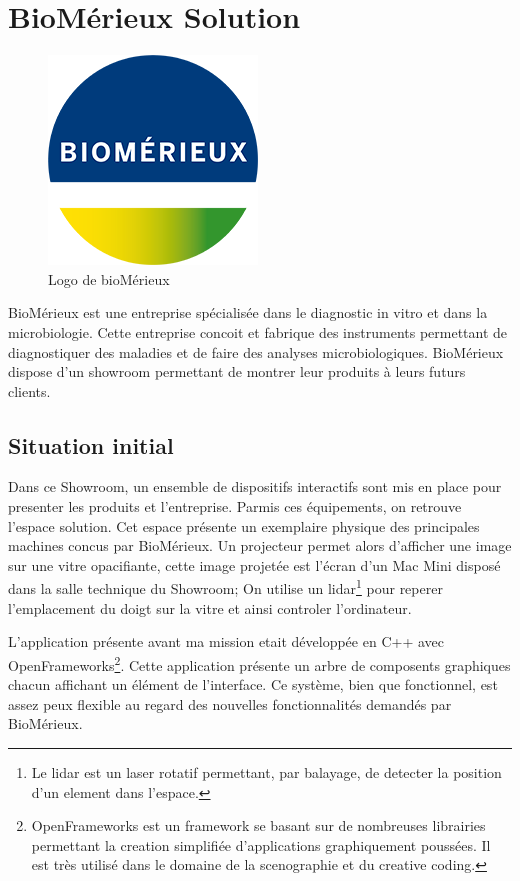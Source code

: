 \section{BioMérieux Solution}

\begin{figure}[h]
    \centering
    \includegraphics[scale=0.5]{img/bmx.png}
    \caption{Logo de bioMérieux}
\end{figure}

BioMérieux est une entreprise spécialisée dans le diagnostic in vitro et dans la microbiologie.
Cette entreprise concoit et fabrique des instruments permettant de diagnostiquer des maladies et de faire des analyses microbiologiques.
BioMérieux dispose d'un showroom permettant de montrer leur produits à leurs futurs clients.

\subsection{Situation initial}

Dans ce Showroom, un ensemble de dispositifs interactifs sont mis en place pour presenter les produits et l'entreprise.
Parmis ces équipements, on retrouve l'espace solution.
Cet espace présente un exemplaire physique des principales machines concus par BioMérieux.
Un projecteur permet alors d'afficher une image sur une vitre opacifiante, cette image projetée est l'écran d'un Mac Mini disposé dans la salle technique du Showroom;
On utilise un lidar\footnote{Le lidar est un laser rotatif permettant, par balayage, de detecter la position d'un element dans l'espace.} pour reperer l'emplacement du doigt sur la vitre et ainsi controler l'ordinateur.

L'application présente avant ma mission etait développée en C++ avec OpenFrameworks\footnote{OpenFrameworks est un framework se basant sur de nombreuses librairies permettant la creation simplifiée d'applications graphiquement poussées. Il est très utilisé dans le domaine de la scenographie et du creative coding.}.
Cette application présente un arbre de composents graphiques chacun affichant un élément de l'interface.
Ce système, bien que fonctionnel, est assez peux flexible au regard des nouvelles fonctionnalités demandés par BioMérieux.

